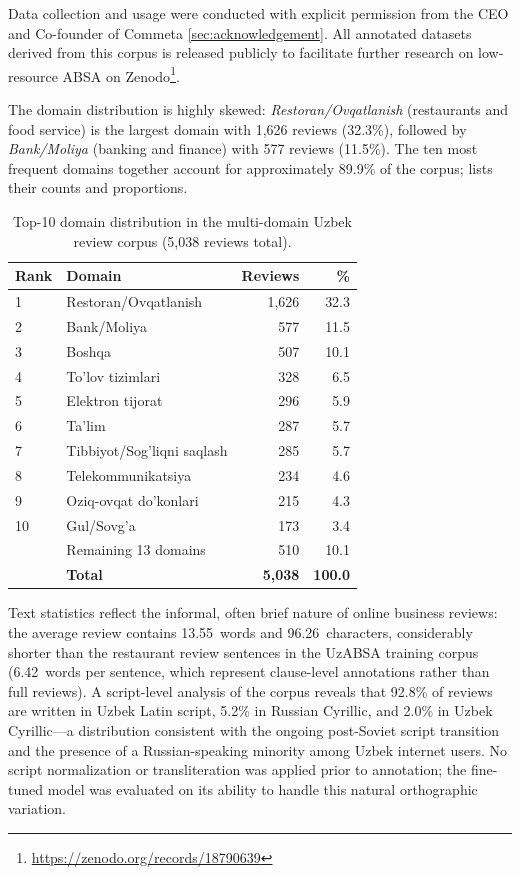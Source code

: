 \documentclass[runningheads]{llncs}
\begin{document}
Data collection and usage were conducted with explicit permission from the CEO and Co-founder of Commeta \ref{sec:acknowledgement}. All annotated datasets derived from this corpus is released publicly to facilitate further research on low-resource ABSA on Zenodo\footnote{\url{https://zenodo.org/records/18790639}}.

The domain distribution is highly skewed: \textit{Restoran/Ovqatlanish} (restaurants and food service) is the largest domain with 1{,}626 reviews (32.3\%), followed by \textit{Bank/Moliya} (banking and finance) with 577 reviews (11.5\%). The ten most frequent domains together account for approximately 89.9\% of the corpus;  lists their counts and proportions.

\begin{table}[t]
\centering
\caption{Top-10 domain distribution in the multi-domain Uzbek review corpus (5{,}038 reviews total).}
\label{tab:domain_dist}
\begin{tabular}{llrr}
\toprule
\textbf{Rank} & \textbf{Domain} & \textbf{Reviews} & \textbf{\%} \\
\midrule
1  & Restoran/Ovqatlanish              & 1{,}626 & 32.3 \\
2  & Bank/Moliya                       &   577   & 11.5 \\
3  & Boshqa                            &   507   & 10.1 \\
4  & To'lov tizimlari                  &   328   &  6.5 \\
5  & Elektron tijorat                  &   296   &  5.9 \\
6  & Ta'lim                            &   287   &  5.7 \\
7  & Tibbiyot/Sog'liqni saqlash        &   285   &  5.7 \\
8  & Telekommunikatsiya                &   234   &  4.6 \\
9  & Oziq-ovqat do'konlari             &   215   &  4.3 \\
10 & Gul/Sovg'a                        &   173   &  3.4 \\
\midrule
   & Remaining 13 domains              &   510   & 10.1 \\
   & \textbf{Total}                    & \textbf{5{,}038} & \textbf{100.0} \\
\bottomrule
\end{tabular}
\end{table}

Text statistics reflect the informal, often brief nature of online business reviews: the average review contains 13.55~words and 96.26~characters, considerably shorter than the restaurant review sentences in the UzABSA training corpus (6.42~words per sentence, which represent clause-level annotations rather than full reviews). A script-level analysis of the corpus reveals that 92.8\% of reviews are written in Uzbek Latin script, 5.2\% in Russian Cyrillic, and 2.0\% in Uzbek Cyrillic---a distribution consistent with the ongoing post-Soviet script transition and the presence of a Russian-speaking minority among Uzbek internet users. No script normalization or transliteration was applied prior to annotation; the fine-tuned model was evaluated on its ability to handle this natural orthographic variation.
\end{document}
